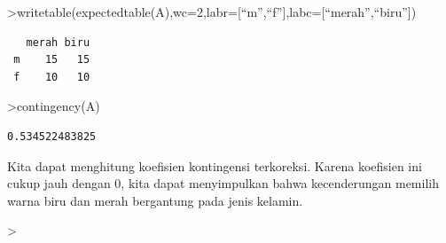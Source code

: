 \documentclass[
]{book}
\begin{document}
\textgreater writetable(expectedtable(A),wc=2,labr={[}``m'',``f''{]},labc={[}``merah'',``biru''{]})

\begin{verbatim}
   merah biru
 m    15   15
 f    10   10
\end{verbatim}

\textgreater contingency(A)

\begin{verbatim}
0.534522483825
\end{verbatim}

Kita dapat menghitung koefisien kontingensi terkoreksi. Karena koefisien ini cukup jauh dengan 0, kita dapat menyimpulkan bahwa kecenderungan memilih warna biru dan merah bergantung pada jenis kelamin.

\textgreater{}

\backmatter
\end{document}
